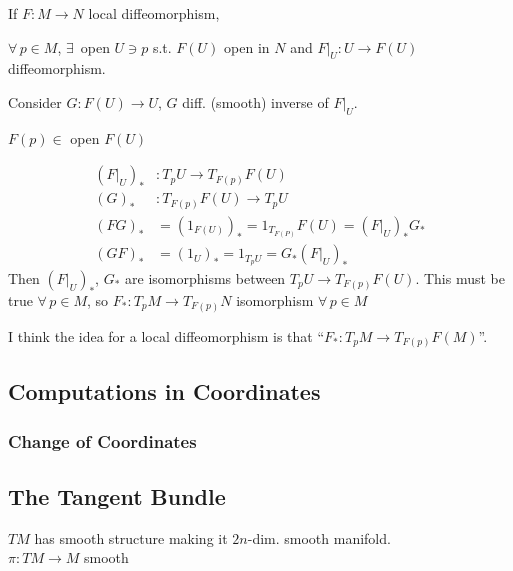  If $F: M \to N$ local diffeomorphism, 

$\forall \, p \in M$, $\exists \, $ open $U \ni p$ s.t. $F(U)$ open in $N$ and $\left. F\right|_U : U \to F(U)$ diffeomorphism.  

Consider $G: F(U) \to U$, $G$ diff. (smooth) inverse of $\left. F \right|_U$.  

$F(p) \in $ open $F(U)$  

\[
\begin{aligned}
  ( \left. F \right|_U )_*    &    : T_pU \to T_{ F(p)}F(U) \\ 
  (G)_*                       &    : T_{F(p)}F(U) \to T_pU \\ 
  (FG)_*                      & = (1_{F(U)} )_* = 1_{T_{F(P)}}F(U) = ( \left. F \right|_U )_* G_* \\
  (GF)_*    & = (1_U)_* = 1_{T_pU} = G_* (  \left. F \right|_U)_*
\end{aligned}
\]
Then $( \left. F \right|_U)_*$, $G_*$ are isomorphisms between $T_pU \to T_{F(p)}F(U)$.  This must be true $\forall \, p \in M$, so $F_* : T_pM \to T_{F(p)}N$ isomorphism $\forall \, p \in M$

I think the idea for a local diffeomorphism is that ``$F_* : T_p M \to T_{F(p)}F(M)$''. 



\subsection*{Computations in Coordinates}

\subsubsection*{Change of Coordinates}







\subsection*{The Tangent Bundle }


\begin{proposition}[3.18] $TM$ has smooth structure making it $2n$-dim. smooth manifold.  \\
$\pi :TM \to M$ smooth \end{proposition}


